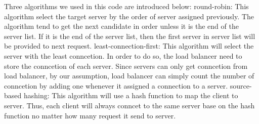 Three algorithms we used in this code are introduced below:
\ci round-robin: This algorithm select the target server by the order of server assigned previously.
The algorithm tend to get the next candidate in order unless it is the end of the server list.
If it is the end of the server list, then the first server in server list will be provided to next request.
\cii least-connection-first: This algorithm will select the server with the least conncetion.
In order to do so, the load balancer need to store the conncetion of each server.
Since servers can only get conncetion from load balancer, by our assumption, load balancer can simply count the number of conncetion by adding one whenever it assigned a connection to a server.
\ciii source-based hashing: This algorithm will use a hash function to map the client to server. Thus, each client will always conncet to the same server base on the hash function no matter how many request it send to server.


